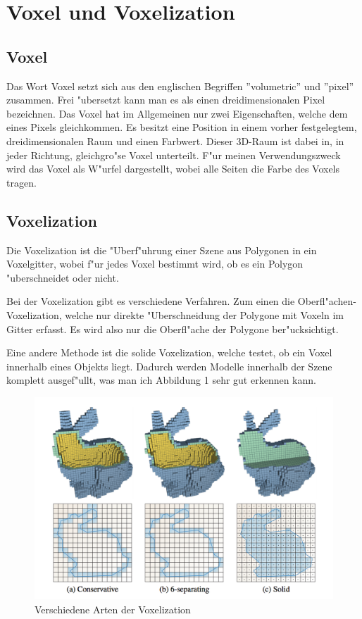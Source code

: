 \documentclass[a4paper, 12pt]{scrartcl}
\begin{document}
\section{Voxel und Voxelization}
\subsection{Voxel}
Das Wort Voxel setzt sich aus den englischen Begriffen ''volumetric'' und ''pixel'' zusammen. Frei "ubersetzt kann man es als einen dreidimensionalen Pixel bezeichnen.
Das Voxel hat im Allgemeinen nur zwei Eigenschaften, welche dem eines Pixels gleichkommen. Es besitzt eine Position in einem vorher festgelegtem, dreidimensionalen Raum und einen Farbwert.
Dieser 3D-Raum ist dabei in, in jeder Richtung, gleichgro"se Voxel unterteilt.
F"ur meinen Verwendungszweck wird das Voxel als W"urfel dargestellt, wobei alle Seiten die Farbe des Voxels tragen.
\subsection{Voxelization}
Die Voxelization ist die "Uberf"uhrung einer Szene aus Polygonen in ein Voxelgitter, wobei f"ur jedes Voxel bestimmt wird, ob es ein Polygon "uberschneidet oder nicht.

Bei der Voxelization gibt es verschiedene Verfahren. Zum einen die Oberfl"achen-Voxelization,  welche nur direkte "Uberschneidung der Polygone mit Voxeln im Gitter erfasst. Es wird also nur die Oberfl"ache der Polygone ber"ucksichtigt.

Eine andere Methode ist die solide Voxelization, welche testet, ob ein Voxel innerhalb eines Objekts liegt. Dadurch werden Modelle innerhalb der Szene komplett ausgef"ullt, was man ich Abbildung 1 sehr gut erkennen kann.

\begin{figure}[h]
	\centering
		\includegraphics[width=14cm]{Kinds-of-Voxelization}
	\caption{Verschiedene Arten der Voxelization}
\end{figure}
\end{document}
